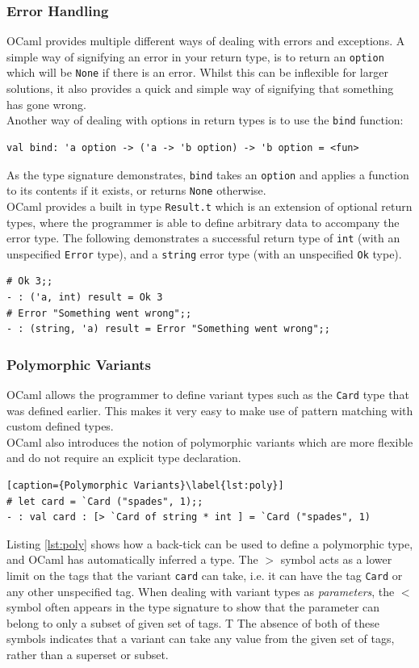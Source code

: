 \documentclass[12pt,a4paper,twoside,openright]{report}
\begin{document}
		\subsubsection*{Error Handling}
		OCaml provides multiple different ways of dealing with errors and exceptions. 
		A simple way of signifying an error in your return type, is to return an \texttt{option} which will be \texttt{None} if there is an error. 
		Whilst this can be inflexible for larger solutions, it also provides a quick and simple way of signifying that something has gone wrong.\\

		Another way of dealing with options in return types is to use the \texttt{bind} function:
		\begin{lstlisting}
val bind: 'a option -> ('a -> 'b option) -> 'b option = <fun>
		\end{lstlisting} 
		As the type signature demonstrates, \texttt{bind} takes an \texttt{option} and applies a function to its contents if it exists, or returns \texttt{None} otherwise.\\
		
		OCaml provides a built in type \texttt{Result.t} which is an extension of optional return types, where the programmer is able to define arbitrary data to accompany the error type. 
		The following demonstrates a successful return type of \texttt{int} (with an unspecified \texttt{Error} type), and a \texttt{string} error type (with an unspecified \texttt{Ok} type).
		\begin{lstlisting}
# Ok 3;;
- : ('a, int) result = Ok 3
# Error "Something went wrong";;
- : (string, 'a) result = Error "Something went wrong";;
		\end{lstlisting} 

		\subsubsection*{Polymorphic Variants}
		OCaml allows the programmer to define variant types such as the \texttt{Card} type that was defined earlier. This makes it very easy to make use of pattern matching with custom defined types.\\
		
		OCaml also introduces the notion of polymorphic variants which are more flexible and do not require an explicit type declaration.
		\begin{lstlisting}[caption={Polymorphic Variants}\label{lst:poly}]
# let card = `Card ("spades", 1);;
- : val card : [> `Card of string * int ] = `Card ("spades", 1)
		\end{lstlisting}
		Listing \ref{lst:poly} shows how a back-tick can be used to define a polymorphic type, and OCaml has automatically inferred a type. 
		The $>$ symbol acts as a lower limit on the tags that the variant \texttt{card} can take, i.e. it can have the tag \texttt{Card} or any other unspecified tag.
		When dealing with variant types as \textit{parameters}, the $<$ symbol often appears in the type signature to show that the parameter can belong to only a subset of given set of tags. T
		The absence of both of these symbols indicates that a variant can take any value from the given set of tags, rather than a superset or subset. 
\end{document}
